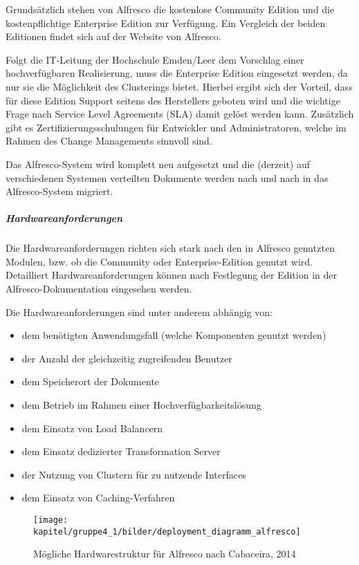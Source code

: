 Grundsätzlich stehen von Alfresco die kostenlose Community Edition und die kostenpflichtige Enterprise Edition zur Verfügung. Ein Vergleich der beiden Editionen findet sich auf der Website\cite{alfresco_community_edition_2015} von Alfresco.

Folgt die IT-Leitung der Hochschule Emden/Leer dem Vorschlag einer hochverfügbaren Realisierung, muss die Enterprise Edition eingesetzt werden, da nur sie die Möglichkeit des Clusterings bietet. Hierbei ergibt sich der Vorteil, dass für diese Edition Support seitens des Herstellers geboten wird und die wichtige Frage nach Service Level Agreements (SLA) damit gelöst werden kann. Zusätzlich gibt es Zertifizierungsschulungen für Entwickler und Administratoren, welche im Rahmen des Change Managements sinnvoll sind.

Das Alfresco-System wird komplett neu aufgesetzt und die (derzeit) auf verschiedenen Systemen verteilten Dokumente werden nach und nach in das Alfresco-System migriert.

\subparagraph{Hardwareanforderungen}
Die Hardwareanforderungen richten sich stark nach den in Alfresco genutzten Modulen, bzw. ob die Community oder Enterprise-Edition genutzt wird. Detailliert Hardwareanforderungen können nach Festlegung der Edition in der Alfresco-Dokumentation\cite{alfresco_documentation_2015} eingesehen werden. 

Die Hardwareanforderungen sind unter anderem abhängig von:

\begin{itemize}
	\item dem benötigten Anwendungsfall (welche Komponenten genutzt werden)
	\item der Anzahl der gleichzeitig zugreifenden Benutzer
	\item dem Speicherort der Dokumente
	\item dem Betrieb im Rahmen einer Hochverfügbarkeitslösung
	\item dem Einsatz von Load Balancern
	\item dem Einsatz dedizierter Transformation Server
	\item der Nutzung von Clustern für zu nutzende Interfaces
	\item dem Einsatz von Caching-Verfahren
\end{itemize}

\begin{figure}[h!]
	\centering
	\texttt{[image: kapitel/gruppe4\_1/bilder/deployment\_diagramm\_alfresco]}
	\caption{Mögliche Hardwarestruktur für Alfresco nach Cabaceira, 2014}
	\label{fig_deployment_alfresco}
\end{figure}

